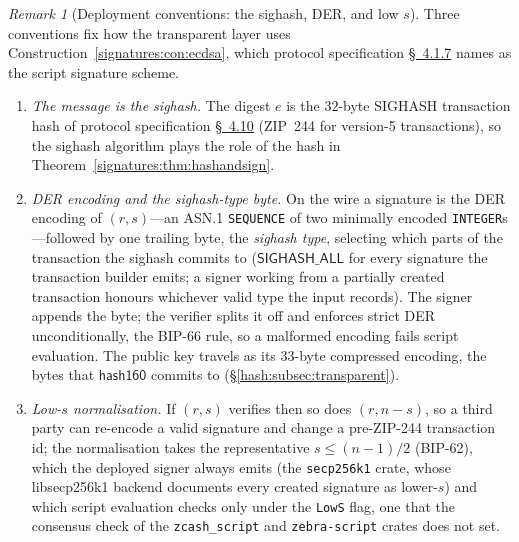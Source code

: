 \documentclass[11pt,a4paper]{article}
\theoremstyle{definition}
\theoremstyle{remark}
\newtheorem{remark}[theorem]{Remark}
\begin{document}
\begin{remark}[Deployment conventions: the sighash, DER, and low
\(s\)]\label{signatures:rem:ecdsa-conventions}
Three conventions fix how the transparent layer uses
Construction~\ref{signatures:con:ecdsa}, which protocol
specification \href{https://zips.z.cash/protocol/protocol.pdf\#abstractsig}{\S~4.1.7} names as the script signature scheme.
\begin{enumerate}
\item \emph{The message is the sighash.} The digest \(e\) is the
  \(32\)-byte SIGHASH transaction hash of protocol specification
  \href{https://zips.z.cash/protocol/protocol.pdf\#sighash}{\S~4.10} (ZIP~244 for version-5 transactions), so the sighash
  algorithm plays the role of the hash in
  Theorem~\ref{signatures:thm:hashandsign}.
\item \emph{DER encoding and the sighash-type byte.} On the wire a
  signature is the DER encoding of \((r, s)\)---an ASN.1
  \texttt{SEQUENCE} of two minimally encoded
  \texttt{INTEGER}s---followed by one trailing byte, the
  \emph{sighash type}, selecting which parts of the transaction the
  sighash commits to (\(\mathsf{SIGHASH\_ALL}\) for every signature
  the transaction builder emits; a signer working from a partially
  created transaction
  honours whichever valid type the input records). The signer
  appends the byte; the verifier splits it off and
  enforces strict DER unconditionally, the BIP-66 rule, so a
  malformed encoding fails script evaluation. The public key travels
  as its \(33\)-byte compressed encoding, the bytes that
  \(\mathsf{hash160}\) commits to (\S\ref{hash:subsec:transparent}).
\item \emph{Low-\(s\) normalisation.} If \((r, s)\) verifies then so
  does \((r, n - s)\), so a third party can re-encode a valid
  signature and change a pre-ZIP-244 transaction id; the
  normalisation takes the representative \(s \le (n-1)/2\) (BIP-62),
  which the deployed signer always emits (the \texttt{secp256k1}
  crate, whose libsecp256k1 backend documents every created signature
  as lower-\(s\)) and which script evaluation checks only under the
  \texttt{LowS} flag, one that the consensus check of the
  \texttt{zcash\_script} and \texttt{zebra-script} crates does not set.
\end{enumerate}
\end{remark}
\end{document}
